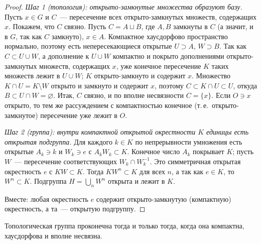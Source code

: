 \begin{proof}
\emph{Шаг 1 (топология): открыто-замкнутые множества образуют базу.} Пусть $x\in G$ и $C$~--- пересечение всех
открыто-замкнутых множеств, содержащих $x$. Покажем, что $C$ связно. Пусть $C=A\sqcup B$, где $A,B$ замкнуты в $C$ (а значит, и в $G$, так как $C$ замкнуто), $x\in A$.
Компактное хаусдорфово пространство нормально, поэтому есть непересекающиеся открытые $U\supset A$, $W\supset B$. Так как
$C\subset U\cup W$, а дополнение к $U\cup W$ компактно и покрыто дополнениями открыто-замкнутых множеств, содержащих $x$,
уже конечное пересечение $K$ таких множеств лежит в $U\cup W$; $K$ открыто-замкнуто и содержит $x$. Множество
$K\cap U=K\setminus W$ открыто и замкнуто и содержит $x$, поэтому $C\subset K\cap U\subset U$, откуда $B\subset U\cap
W=\varnothing$. Итак, $C$ связно, и по вполне несвязности $C=\{x\}$. Если $O\ni x$ открыто, то тем же рассуждением с
компактностью конечное (т.\,е.\ открыто-замкнутое) пересечение уже лежит в $O$.

\emph{Шаг 2 (группа): внутри компактной открытой окрестности $K$ единицы есть открытая подгруппа.} Для каждого $k\in K$ по
непрерывности умножения есть открытые $A_k\ni k$ и $W_k\ni e$ с $A_kW_k\subset K$. Конечное число $A_k$ покрывает $K$;
пусть $W$~--- пересечение соответствующих $W_k\cap W_k^{-1}$. Это симметричная открытая окрестность $e$ с $KW\subset K$.
Тогда $KW^n\subset K$ для всех $n$, а так как $e\in K$, то $W^n\subset K$. Подгруппа $H=\bigcup_nW^n$ открыта и лежит в
$K$.

Вместе: любая окрестность $e$ содержит открыто-замкнутую (компактную) окрестность, а та~--- открытую подгруппу.
\end{proof}

\begin{proposition}[7.25]
Топологическая группа проконечна тогда и только тогда, когда она компактна, хаусдорфова и вполне несвязна.
\end{proposition}

